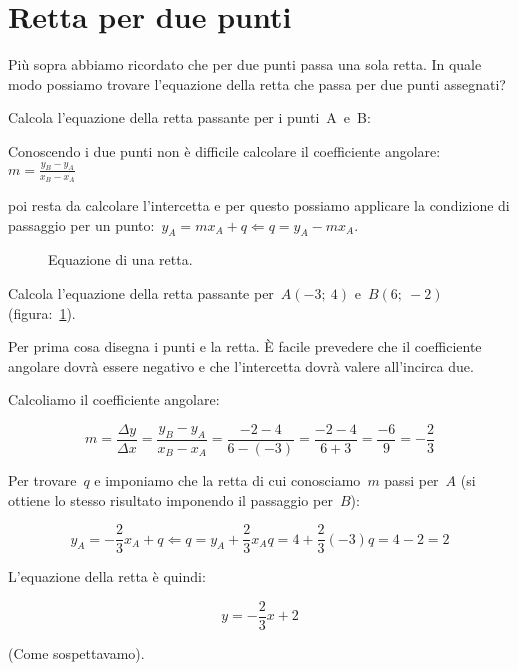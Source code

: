 \section{Retta per due punti}
\label{sec:retta_rettaperduepunti}

Più sopra abbiamo ricordato che per due punti passa una sola retta. 
In quale modo possiamo trovare l'equazione della retta che passa per due 
punti assegnati?

\begin{procedura}
 Calcola l'equazione della retta passante per i punti~A~e~B:
 \begin{enumeratea}
  \item Conoscendo i due punti non è difficile calcolare il coefficiente 
   angolare:~$m = \frac{y_B - y_A}{x_B - x_A}$
  \item poi resta da calcolare l'intercetta e per questo possiamo applicare 
   la condizione di passaggio per un 
   punto:~$y_A = m x_A + q \Leftarrow q = y_A - m x_A$.
 \end{enumeratea}
\end{procedura}


\begin{exrig}
 \begin{esempio}

  \begin{inaccessibleblock}
 \begin{figure}[h]
    \centering
    \caption{Equazione di una retta.}\label{fig:equazione}
  \end{figure}
\end{inaccessibleblock}

Calcola l'equazione della retta passante per~$A(-3;~4)$ e~$B(6;~-2)$ 
(figura:~\ref{fig:equazione}).

Per prima cosa disegna i punti e la retta. È facile prevedere che il 
coefficiente angolare dovrà essere negativo e che l'intercetta dovrà valere
all'incirca due. 

Calcoliamo il coefficiente angolare:

\[m = \frac{\Delta y}{\Delta x} = \frac{y_B - y_A}{x_B - x_A} =
      \frac{-2 - 4}{6 -(-3)} = \frac{-2 - 4}{6 + 3} = \frac{-6}{9} = 
      - \frac{2}{3}
\]

Per trovare~$q$ e imponiamo che la retta di cui conosciamo~$m$ passi per~$A$ 
(si ottiene lo stesso risultato imponendo il passaggio per~$B$):

\[y_A = - \frac{2}{3} x_A + q \Leftarrow 
    q = y_A +\frac{2}{3} x_A  
    q = 4 +\frac{2}{3} (-3) 
    q = 4 - 2 = 2 
\]

L'equazione della retta è quindi:

\[y = - \frac{2}{3} x + 2\]

(Come sospettavamo).
 \end{esempio}
\end{exrig}

